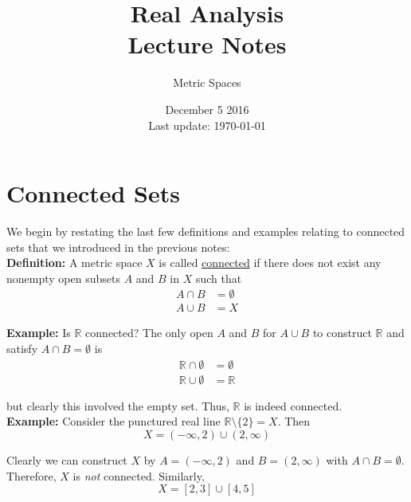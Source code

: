 \documentclass[12pt]{article}
\newlength\tindent
\renewcommand{\indent}{\hspace*{\tindent}}
\newcommand{\R}{\mathbb R}
\begin{document}
 
 
\title{Real Analysis\\Lecture Notes}
\author{Metric Spaces}
\date{December 5 2016 \\ Last update: \today{}}
\maketitle

\section{Connected Sets}

\indent We begin by restating the last few definitions and examples relating to connected sets that we introduced in the previous notes: \\

%
%
{\bf Definition:} A metric space $X$ is called \underline{connected} if there does not exist any nonempty open subsets $A$ and $B$ in $X$ such that
\begin{align*}
	A \cap B &= \emptyset \\
	A \cup B &= X
\end{align*}

%
%
{\bf Example:} Is $\R$ connected? The only open $A$ and $B$ for $A \cup B$ to construct $\R$ and satisfy $A \cap B = \emptyset$ is
\begin{align*}
	\R \cap \emptyset &= \emptyset \\
	\R \cup \emptyset &= \R
\end{align*}

but clearly this involved the empty set. Thus, $\R$ is indeed connected. \\

%
%
{\bf Example:} Consider the punctured real line $\R\setminus\{2\} = X$. Then
\begin{equation*}
	X = \left(-\infty, 2\right) \cup \left(2, \infty\right)
\end{equation*}

Clearly we can construct $X$ by $A = \left(-\infty, 2\right)$ and $B = \left(2, \infty\right)$ with $A \cap B = \emptyset$. Therefore, $X$ is {\em not} connected. Similarly,
\begin{equation*}
	X = [2,3]\cup[4,5]
\end{equation*}
\end{document}
